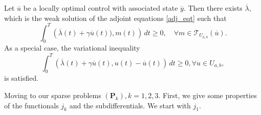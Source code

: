 \documentclass[reqno]{amsart}
\begin{document}
	\begin{theorem}\label{theo4.1}
		Let $\overline{u}$ be a locally optimal control with associated state $\overline{y}$. Then there exists $\overline{\lambda}$, which is the weak solution of the adjoint equations \eqref{adj_eqt} such that
		\begin{equation}\label{4.2}
			\int_{0}^{T} \left( \overline{\lambda}(t)+\gamma \overline{u}(t)),m(t) \right) \,dt \ge 0,\quad  \forall m \in \mathcal{T}_{U_{a,b}}(\overline{u}).
		\end{equation}
		As a special case, the variational inequality
		\begin{equation} \label{4.3}
			\int_{0}^{T} \left( \overline{\lambda}(t)+\gamma \overline{u}(t),u(t)-\overline{u}(t) \right)\,dt \ge 0, \forall u \in U_{a,b},
		\end{equation}
		is satisfied.
	\end{theorem}
	
	Moving to our sparse problems $(\textbf{P}_k), k=1,2,3$. First, we give some properties of the functionals $j_k$ and the subdifferentials. We start with $j_1$.\\
	
\end{document}
